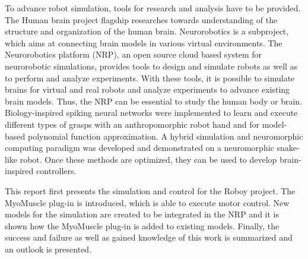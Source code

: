 To advance robot simulation, tools for research and analysis have to be provided. The Human brain project flagship researches towards understanding of the structure and organization of the human brain\cite{HBPpaper,HBP}. Neurorobotics is a subproject, which aims at connecting brain models in various virtual environments\cite{NRPpaper}. The Neurorobotics platform (NRP), an open source cloud based system for neurorobotic simulations, provides tools to design and simulate robots as well as to perform and analyze experiments. With these tools, it is possible to simulate brains for virtual and real robots and analyze experiments to advance existing brain models. Thus, the NRP can be essential to study the human body or brain. Biology-inspired spiking neural networks were implemented to learn and execute different types of grasps with an anthropomorphic robot hand\cite{NRPhand} and for model-based polynomial function approximation\cite{NRPsnn}. A hybrid simulation and neuromorphic computing paradigm was developed and demonstrated on a neuromorphic snake-like robot\cite{NRPsnake}. Once these methods are optimized, they can be used to develop brain-inspired controllers.

This report first presents the simulation and control for the Roboy project. The MyoMuscle plug-in\cite{BA} is introduced, which is able to execute motor control. New models for the simulation are created to be integrated in the NRP and it is shown how the MyoMuscle plug-in is added to existing models. Finally, the success and failure as well as gained knowledge of this work is summarized and an outlook is presented.